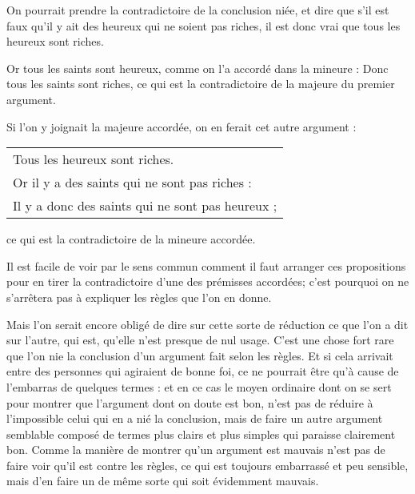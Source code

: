 On pourrait prendre la contradictoire de la conclusion niée, et dire que s'il est faux qu'il y ait des heureux qui ne soient pas riches, il est donc vrai que tous les heureux sont riches.

Or tous les saints sont heureux, comme on l'a accordé dans la mineure : Donc tous les saints sont riches, ce qui est la contradictoire de la majeure du premier argument.

Si l'on y joignait la majeure accordée, on en ferait cet autre argument :

\begin{center}
	\begin{tabular}{l}
		Tous les heureux sont riches. \\
		Or il y a des saints qui ne sont pas riches : \\
		Il y a donc des saints qui ne sont pas heureux ; \\
	\end{tabular}
\end{center}

ce qui est la contradictoire de la mineure accordée.

\bigbreak
Il est facile de voir par le sens commun comment il faut arranger ces propositions pour en tirer la contradictoire d'une des prémisses accordées; c'est pourquoi on ne s'arrêtera pas à expliquer les règles que l'on en donne.

Mais l'on serait encore obligé de dire sur cette sorte de réduction ce que l'on a dit sur l'autre, qui est, qu'elle n'est presque de nul usage. C'est une chose fort rare que l'on nie la conclusion d'un argument fait selon les règles. Et si cela arrivait entre des personnes qui agiraient de bonne foi, ce ne pourrait être qu'à cause de l'embarras de quelques termes : et en ce cas le moyen ordinaire dont on se sert pour montrer que l'argument dont on doute est bon, n'est pas de réduire à l'impossible celui qui en a nié la conclusion, mais de faire un autre argument semblable composé de termes plus clairs et plus simples qui paraisse clairement bon. Comme la manière de montrer qu'un argument est mauvais n'est pas de faire voir qu'il est contre les règles, ce qui est toujours embarrassé et peu sensible, mais d'en faire un de même sorte qui soit évidemment mauvais.

